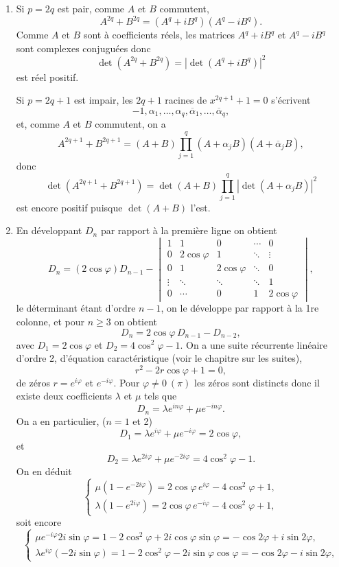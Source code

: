 \begin{enumerate}[label=\arabic*.,leftmargin=2.2em,itemsep=1.2em]
\item Si $p=2q$ est pair, comme $A$ et $B$ commutent,
\[
A^{2q}+B^{2q}=(A^q+iB^q)(A^q-iB^q).
\]
Comme $A$ et $B$ sont à coefficients réels, les matrices $A^q+iB^q$ et $A^q-iB^q$ sont complexes conjuguées donc
\[
\det(A^{2q}+B^{2q})=|\det(A^q+iB^q)|^2
\]
est réel positif.

Si $p=2q+1$ est impair, les $2q+1$ racines de $x^{2q+1}+1=0$ s'écrivent
\[
-1,\alpha_1,\ldots,\alpha_q,\overline\alpha_1,\ldots,\overline\alpha_q,
\]
et, comme $A$ et $B$ commutent, on a
\[
A^{2q+1}+B^{2q+1}=(A+B)\prod_{j=1}^q(A+\alpha_jB)(A+\overline\alpha_jB),
\]
donc
\[
\det(A^{2q+1}+B^{2q+1})=\det(A+B)\prod_{j=1}^q|\det(A+\alpha_jB)|^2
\]
est encore positif puisque $\det(A+B)$ l'est.

\item En développant $D_n$ par rapport à la première ligne on obtient
\[
D_n=(2\cos\varphi)D_{n-1}-
\begin{vmatrix}
1&1&0&\cdots&0\\
0&2\cos\varphi&1&\ddots&\vdots\\
0&1&2\cos\varphi&\ddots&0\\
\vdots&\ddots&\ddots&\ddots&1\\
0&\cdots&0&1&2\cos\varphi
\end{vmatrix},
\]
le déterminant étant d'ordre $n-1$, on le développe par rapport à la 1re colonne, et pour $n\ge3$ on obtient
\[
D_n=2\cos\varphi\,D_{n-1}-D_{n-2},
\]
avec $D_1=2\cos\varphi$ et $D_2=4\cos^2\varphi-1$. On a une suite récurrente linéaire d'ordre 2, d'équation caractéristique (voir le chapitre sur les suites),
\[
r^2-2r\cos\varphi+1=0,
\]
de zéros $r=e^{i\varphi}$ et $e^{-i\varphi}$. Pour $\varphi\ne0\ (\pi)$ les zéros sont distincts donc il existe deux coefficients $\lambda$ et $\mu$ tels que
\[
D_n=\lambda e^{in\varphi}+\mu e^{-in\varphi}.
\]
On a en particulier, ($n=1$ et 2)
\[
D_1=\lambda e^{i\varphi}+\mu e^{-i\varphi}=2\cos\varphi,
\]
et
\[
D_2=\lambda e^{2i\varphi}+\mu e^{-2i\varphi}=4\cos^2\varphi-1.
\]
On en déduit
\[
\begin{cases}
\mu(1-e^{-2i\varphi})=2\cos\varphi\,e^{i\varphi}-4\cos^2\varphi+1,\\
\lambda(1-e^{2i\varphi})=2\cos\varphi\,e^{-i\varphi}-4\cos^2\varphi+1,
\end{cases}
\]
soit encore
\[
\begin{cases}
\mu e^{-i\varphi}2i\sin\varphi=1-2\cos^2\varphi+2i\cos\varphi\sin\varphi=-\cos2\varphi+i\sin2\varphi,\\
\lambda e^{i\varphi}(-2i\sin\varphi)=1-2\cos^2\varphi-2i\sin\varphi\cos\varphi=-\cos2\varphi-i\sin2\varphi,

\end{cases}\]
\end{enumerate}
